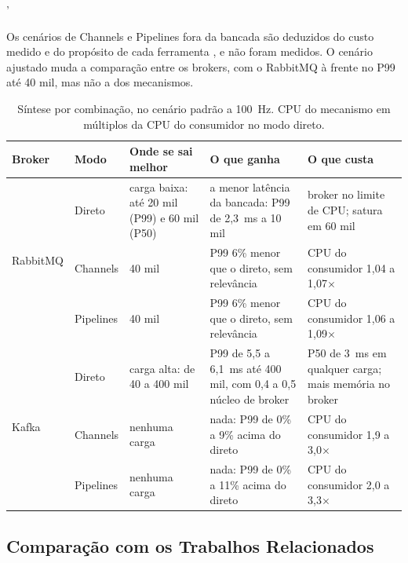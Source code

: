 '\documentclass[12pt]{article}
\begin{document}
Os cenários de Channels e Pipelines fora da bancada são deduzidos do custo medido e do
propósito de cada ferramenta \cite{microsoft:channels,microsoft:pipelines}, e não foram
medidos. O cenário ajustado muda a comparação entre os brokers, com o RabbitMQ à frente no
P99 até 40 mil, mas não a dos mecanismos.

\begin{table}[ht]
\centering
\caption{Síntese por combinação, no cenário padrão a 100~Hz. CPU do mecanismo em
múltiplos da CPU do consumidor no modo direto.}
\label{tab:sintese}
\small
\begin{tabular}{|l|l|p{3.0cm}|p{4.1cm}|p{3.7cm}|}
\hline
\textbf{Broker} & \textbf{Modo} & \textbf{Onde se sai melhor} & \textbf{O que ganha} & \textbf{O que custa} \\
\hline
\multirow{3}{*}{RabbitMQ} & Direto & carga baixa: até 20 mil (P99) e 60 mil (P50) & a menor latência da bancada: P99 de 2,3~ms a 10 mil & broker no limite de CPU; satura em 60 mil \\
\cline{2-5}
 & Channels & 40 mil & P99 6\% menor que o direto, sem relevância & CPU do consumidor 1,04 a 1,07$\times$ \\
\cline{2-5}
 & Pipelines & 40 mil & P99 6\% menor que o direto, sem relevância & CPU do consumidor 1,06 a 1,09$\times$ \\
\hline
\multirow{3}{*}{Kafka} & Direto & carga alta: de 40 a 400 mil & P99 de 5,5 a 6,1~ms até 400 mil, com 0,4 a 0,5 núcleo de broker & P50 de 3~ms em qualquer carga; mais memória no broker \\
\cline{2-5}
 & Channels & nenhuma carga & nada: P99 de 0\% a 9\% acima do direto & CPU do consumidor 1,9 a 3,0$\times$ \\
\cline{2-5}
 & Pipelines & nenhuma carga & nada: P99 de 0\% a 11\% acima do direto & CPU do consumidor 2,0 a 3,3$\times$ \\
\hline
\end{tabular}
\end{table}

\subsection{Comparação com os Trabalhos Relacionados}
\label{sec:comparacao}
\end{document}
